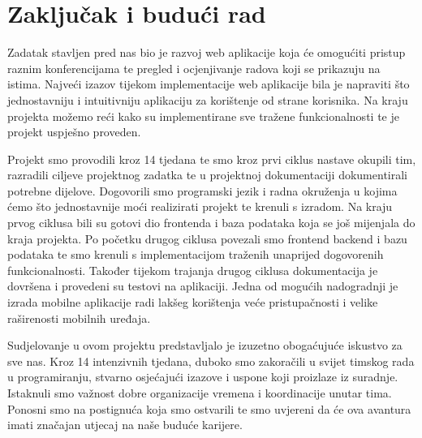 \chapter{Zaključak i budući rad}
		

		
		 \textit{}Zadatak stavljen pred nas bio je razvoj web aplikacije koja će omogućiti pristup raznim konferencijama te pregled i ocjenjivanje radova koji se prikazuju na istima. Najveći izazov tijekom implementacije web aplikacije bila je napraviti što jednostavniju i intuitivniju aplikaciju za korištenje od strane korisnika. Na kraju projekta možemo reći kako su implementirane sve tražene funkcionalnosti te je projekt uspješno proveden.
		 
		 \textit{}Projekt smo provodili kroz 14 tjedana te smo kroz prvi ciklus nastave okupili tim, razradili ciljeve projektnog zadatka te u projektnoj dokumentaciji dokumentirali potrebne dijelove. Dogovorili smo programski jezik i radna okruženja u kojima ćemo što jednostavnije moći realizirati projekt te krenuli s izradom. Na kraju prvog ciklusa bili su gotovi dio frontenda i baza podataka koja se još mijenjala do kraja projekta. Po početku drugog ciklusa povezali smo frontend backend i bazu podataka te smo krenuli s implementacijom traženih unaprijed dogovorenih funkcionalnosti. Također tijekom trajanja drugog ciklusa dokumentacija je dovršena i provedeni su testovi na aplikaciji. Jedna od mogućih nadogradnji je izrada mobilne aplikacije radi lakšeg korištenja veće pristupačnosti i velike raširenosti mobilnih uređaja.
		 
		 \textit{}Sudjelovanje u ovom projektu predstavljalo je izuzetno obogaćujuće iskustvo za sve nas. Kroz 14 intenzivnih tjedana, duboko smo zakoračili u svijet timskog rada u programiranju, stvarno osjećajući izazove i uspone koji proizlaze iz suradnje. Istaknuli smo važnost dobre organizacije vremena i koordinacije unutar tima. Ponosni smo na postignuća koja smo ostvarili te smo uvjereni da će ova avantura imati značajan utjecaj na naše buduće karijere. 
		
		\eject 